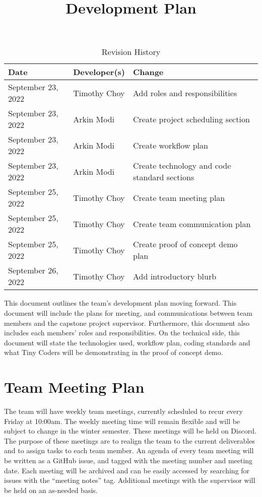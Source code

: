\documentclass{article}
\title{Development Plan\\\progname}
\author{\authname}
\date{}
\begin{document}
\maketitle

\begin{table}[hp]
	\caption{Revision History} \label{TblRevisionHistory}
	\begin{tabularx}{\textwidth}{llX}
		\toprule
		\textbf{Date}      & \textbf{Developer(s)} & \textbf{Change}                              \\
		\midrule
		September 23, 2022 & Timothy Choy          & Add roles and responsibilities               \\
		September 23, 2022 & Arkin Modi            & Create project scheduling section            \\
		September 23, 2022 & Arkin Modi            & Create workflow plan                         \\
		September 23, 2022 & Arkin Modi            & Create technology and code standard sections \\
		September 25, 2022 & Timothy Choy          & Create team meeting plan                     \\
		September 25, 2022 & Timothy Choy          & Create team communication plan               \\
		September 25, 2022 & Timothy Choy          & Create proof of concept demo plan            \\
		September 26, 2022 & Timothy Choy          & Add introductory blurb                       \\
		\bottomrule
	\end{tabularx}
\end{table}

This document outlines the team's development plan moving forward. This document will include the
plans for meeting, and communications between team members and the capstone project supervisor.
Furthermore, this document also includes each members' roles and responsibilities. On the technical
side, this document will state the technologies used, workflow plan, coding standards and what Tiny
Coders will be demonstrating in the proof of concept demo.

\section{Team Meeting Plan}

The team will have weekly team meetings, currently scheduled to recur every Friday at 10:00am. The
weekly meeting time will remain flexible and will be subject to change in the winter semester.
These meetings will be held on Discord. The purpose of these meetings are to realign the team to
the current deliverables and to assign tasks to each team member. An agenda of every team meeting
will be written as a GitHub issue, and tagged with the meeting number and meeting date. Each
meeting will be archived and can be easily accessed by searching for issues with the ``meeting
notes'' tag. Additional meetings with the supervisor will be held on an as-needed basis.
\end{document}
